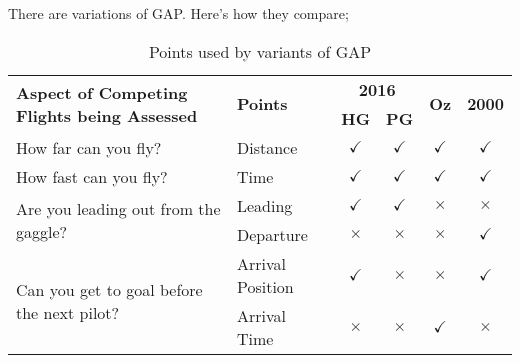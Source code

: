 \documentclass[gap.tex]{subfiles}
\begin{document}
There are variations of GAP. Here's how they compare;
\begin{table}[!ht]
    \begin{tabularx}{\textwidth}{|X|l|c|c|c|c|}
    \hline
         \multirow{2}{*}{\textbf{Aspect of Competing Flights being Assessed}}
         & \multirow{2}{*}{\textbf{Points}}
         & \multicolumn{2}{c|}{\textbf{2016}}
         & \multirow{2}{*}{\textbf{Oz}}
         & \multirow{2}{*}{\textbf{2000}} \\
    \cline{3-4}
         &
         & \textbf{HG}
         & \textbf{PG}
         &
         & \\
    \hline
        How far can you fly? & Distance         & $\checkmark$ & $\checkmark$ & $\checkmark$ & $\checkmark$ \\
    \hline
        How fast can you fly? & Time             & $\checkmark$ & $\checkmark$ & $\checkmark$ & $\checkmark$ \\
    \hline
        \multirow{2}{*}{Are you leading out from the gaggle?} & Leading          & $\checkmark$ & $\checkmark$ & $\times$     & $\times$ \\
    \cline{2-6}
        & Departure        & $\times$     & $\times$     & $\times$     & $\checkmark$ \\
    \hline
        \multirow{2}{*}{Can you get to goal before the next pilot?} & Arrival Position & $\checkmark$ & $\times$     & $\times$     & $\checkmark$ \\
    \cline{2-6}
        & Arrival Time     & $\times$     & $\times$     & $\checkmark$ & $\times$ \\
    \hline
    \end{tabularx}
    \caption{Points used by variants of GAP}
    \label{tab:gap-variants}
\end{table}
\end{document}
